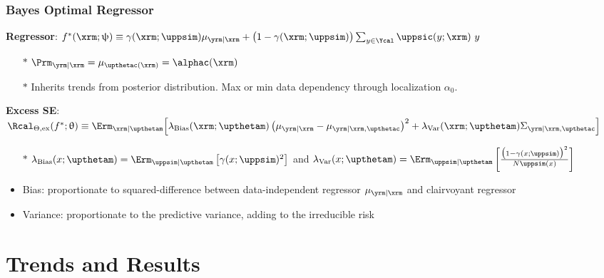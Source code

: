 \documentclass[aspectratio=169]{beamer}
\begin{document}
\begin{frame}
\frametitle{Bayes Optimal Regressor}

\textbf{Regressor}: $f^*(\xrm;\uppsi) \equiv \gamma(\xrm; \uppsim) \mu_{\yrm | \xrm} + \big(1-\gamma(\xrm; \uppsim)\big) \sum_{y \in \Ycal} \uppsic(y;\xrm) \ y$
\begin{itemize}
\item[$*$] $\Prm_{\yrm | \xrm} = \mu_{\upthetac(\xrm)} = \alphac(\xrm)$
\item[$*$] Inherits trends from posterior distribution. Max or min data dependency through localization $\alpha_0$.
\end{itemize}

\hrulefill
\vspace{1.5em}

\textbf{Excess SE}: $\Rcal_{\Theta, \mathrm{ex}}(f^* ; \uptheta) \equiv \Erm_{\xrm | \upthetam}\Big[ \lambda_{\text{Bias}}(\xrm; \upthetam) \left( \mu_{\yrm | \xrm} - \mu_{\yrm | \xrm,\upthetac} \right)^2 + \lambda_{\text{Var}}(\xrm; \upthetam) \Sigma_{\yrm | \xrm,\upthetac} \Big]$
\begin{itemize}
\item[$*$] \footnotesize $\lambda_{\text{Bias}}(x; \upthetam) = \Erm_{\uppsim | \upthetam}\left[ \gamma(x; \uppsim)^2 \right]$ and $\lambda_{\text{Var}}(x; \upthetam) = \Erm_{\uppsim | \upthetam}\left[ \frac{\big( 1 - \gamma(x; \uppsim) \big)^2}{N \uppsim(x)} \right]$ \normalsize
\end{itemize}

\begin{itemize}
\item \alert{Bias}: proportionate to squared-difference between data-independent regressor $\mu_{\yrm | \xrm}$ and clairvoyant regressor
\item \alert{Variance}: proportionate to the predictive variance, adding to the irreducible risk
\end{itemize}

\end{frame}






\section{Trends and Results}
\end{document}
